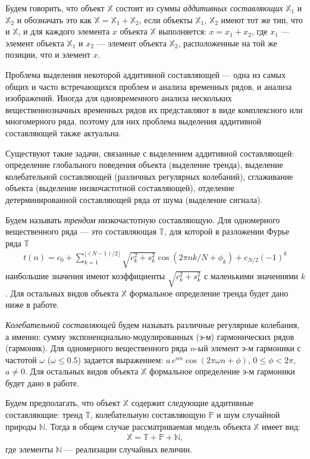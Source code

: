 \documentclass[specialist,
               substylefile = spbu.rtx,
               subf,href,colorlinks=true, 12pt]{disser}
\begin{document}
Будем говорить, что объект $\mathbb{X}$ состоит из суммы \textit{аддитивных составляющих} $\mathbb{X}_1$ и $\mathbb{X}_2$ и обозначать это как $\mathbb{X}=\mathbb{X}_1 + \mathbb{X}_2$, если объекты $\mathbb{X}_1$, $\mathbb{X}_2$ имеют тот же тип, что и $\mathbb{X}$, и для каждого элемента $x$ объекта $\mathbb{X}$ выполняется: $x = x_1 + x_2$, где $x_1$ --- элемент объекта $\mathbb{X}_1$ и $x_2$ --- элемент объекта $\mathbb{X}_2$, расположенные на той же позиции, что и элемент $x$.

Проблема выделения некоторой аддитивной составляющей --- одна из самых общих и часто встречающихся проблем и анализа временных рядов, и анализа изображений. Иногда для одновременного анализа нескольких вещественнозначных временных рядов их представляют в виде комплексного или многомерного ряда, поэтому для них проблема выделения аддитивной составляющей также актуальна.

Существуют такие задачи, связанные с выделением аддитивной составляющей: определение глобального поведения объекта (выделение тренда), выделение колебательной составляющей (различных регулярных колебаний), сглаживание объекта (выделение низкочастотной составляющей), отделение детерминированной составляющей ряда от шума (выделение сигнала).

Будем называть \textit{трендом} низкочастотную составляющую. Для одномерного вещественного ряда --- это составляющая $\mathbb{T}$, для которой в разложении Фурье ряда $\mathbb{T}$
\begin{gather*}
t(n) = c_0 + \sum_{k=1}^{\lfloor (N-1)/2 \rfloor}\sqrt{c_k^2 + s_k^2} \cos(2\pi n k /N + \phi_k) + c_{N/2} (-1)^k
\end{gather*}
 наибольшие значения имеют коэффициенты $\sqrt{c_k^2 + s_k^2}$ с маленькими значениями $k$. Для остальных видов объекта $\mathbb{X}$ формальное определение тренда будет дано ниже в работе.

\textit{Колебательной составляющей} будем называть различные регулярные колебания, а именно: сумму экспоненциально-модулированных (э-м) гармонических рядов (гармоник).
Для одномерного вещественного ряда $n$-ый элемент э-м гармоники с частотой $\omega$ ($\omega \leqslant
0.5$) задается выражением:
$
a \,e^{\alpha n} \cos(2\pi \omega n  + \phi)
$, $0 \leqslant \phi < 2\pi$, $a \not = 0$.
 Для остальных видов объекта $\mathbb{X}$ формальное определение э-м гармоники будет дано в работе.

Будем предполагать, что объект $\mathbb{X}$ содержит следующие аддитивные составляющие: тренд $\mathbb{T}$, колебательную составляющую $\mathbb{P}$ и шум случайной природы $\mathbb{N}$. Тогда в общем случае рассматриваемая модель объекта $\mathbb{X}$ имеет вид:
\begin{gather*}
\mathbb{X} = \mathbb{T}+\mathbb{P}+\mathbb{N},
\end{gather*}
где элементы $\mathbb{N}$ --- реализации случайных величин.
\end{document}
